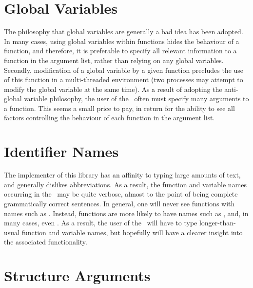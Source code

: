 \section{Global Variables}

The philosophy that global variables are generally a bad idea has been
adopted.  In many cases, using global variables within functions
hides the behaviour of a function, and therefore,
it is preferable to specify all relevant information to
a function in the argument list, rather than relying on any global
variables.  Secondly, modification of a global variable by a given function
precludes the use of this function in a multi-threaded environment
(two processes may attempt to modify the global variable at the same
time).  As a result of adopting the anti-global variable philosophy, the
user of the \vol\  often must specify
many arguments to a function.  This seems a small price to pay, in
return for the ability to see all factors controlling
the behaviour of each function in the argument list.

\section{Identifier Names}

The implementer of this library has an affinity to typing large
amounts of text, and generally dislikes abbreviations.  As a result,
the function and variable names occurring in the \vol\  may
be quite verbose, almost to the point of being complete grammatically
correct sentences.  In general, one will never see functions with names
such as .  Instead, functions are more likely to have
names such as , and, in many cases, even
.  As a result, the user of the
\vol\ will have to type longer-than-usual function and variable
names, but hopefully will have a clearer insight into the associated
functionality.

\section{Structure Arguments}

